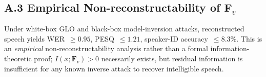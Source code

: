 \documentclass[lettersize,journal]{IEEEtran}
\begin{document}
\subsection*{A.3 Empirical Non-reconstructability of $\bm{F}_v$}

Under white-box GLO and black-box model-inversion attacks, reconstructed speech yields WER~$\ge 0.95$, PESQ~$\le 1.21$, speaker-ID accuracy~$\le 8.3\%$. This is an \emph{empirical} non-reconstructability analysis rather than a formal information-theoretic proof; $I(x;\bm{F}_v)>0$ necessarily exists, but residual information is insufficient for any known inverse attack to recover intelligible speech.

\balance



\end{document}

